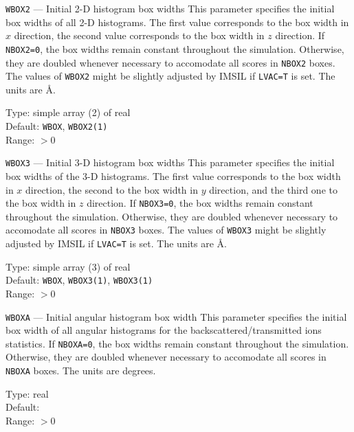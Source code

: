 \begin{keydescription}{\texttt{WBOX2} --- Initial 2-D histogram box widths}
%
  This parameter specifies the initial box widths of all 2-D histograms. The first value 
  corresponds to the box width in $x$ direction, the second value corresponds to the box width 
  in $z$ direction. If \texttt{NBOX2=0}, the box widths remain constant
  throughout the simulation. Otherwise, they are doubled whenever necessary
  to accomodate all scores in \texttt{NBOX2} boxes. The values of \texttt{WBOX2}
  might be slightly adjusted by IMSIL if \texttt{LVAC=T} is set. The units are
  \AA.  
  \begin{keytab}
    Type:    \> simple array (2) of real \\
    Default: \> \texttt{WBOX}, \texttt{WBOX2(1)} \\
    Range:   \> $> 0$
  \end{keytab}
\end{keydescription}

\begin{keydescription}{\texttt{WBOX3} --- Initial 3-D histogram box widths}
%
  This parameter specifies the initial box widths of the 3-D histograms. The first value 
  corresponds to the box width in $x$ direction, the second to the box width in $y$ direction, 
  and the third one to the box width in $z$ direction. If \texttt{NBOX3=0}, the
  box widths remain constant throughout the simulation. Otherwise, they are
  doubled whenever necessary to accomodate all scores in \texttt{NBOX3} boxes.
  The values of \texttt{WBOX3} might be slightly adjusted by IMSIL if
  \texttt{LVAC=T} is set. The units are \AA. 
  \begin{keytab}
    Type:    \> simple array (3) of real \\
    Default: \> \texttt{WBOX}, \texttt{WBOX3(1)}, \texttt{WBOX3(1)} \\
    Range:   \> $> 0$
  \end{keytab}
\end{keydescription}

\begin{keydescription}{\texttt{WBOXA} --- Initial angular histogram box width}
%
  This parameter specifies the initial box width of all angular histograms for the 
  backscattered/transmitted ions statistics. If \texttt{NBOXA=0}, the box
  widths remain constant throughout the simulation. Otherwise, they are doubled
  whenever necessary to accomodate all scores in \texttt{NBOXA} boxes. The
  units are degrees. 
  \begin{keytab}
    Type:    \> real \\
    Default:  \\
    Range:   \> $> 0$
  \end{keytab}
\end{keydescription}

